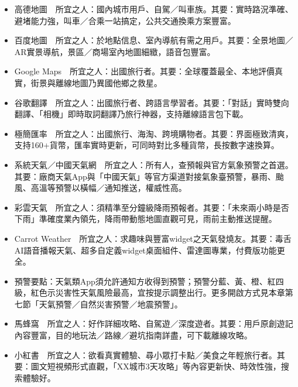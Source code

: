 
\begin{itemize}
  \item 高德地圖　所宜之人：國內城市用戶、自駕／叫車族。其要：實時路況準確、避堵能力強，叫車／合乘一站搞定，公共交通換乘方案豐富。
  \item 百度地圖　所宜之人：於地點信息、室內導航有需之用戶。其要：全景地圖／AR實景導航，景區／商場室內地圖細緻，語音包豐富。
  \item Google Maps　所宜之人：出國旅行者。其要：全球覆蓋最全、本地評價真實，街景與離線地圖乃異國他鄉之救星。
\end{itemize}


\begin{itemize}
  \item 谷歌翻譯　所宜之人：出國旅行者、跨語言學習者。其要：「對話」實時雙向翻譯、「相機」即時取詞翻譯乃旅行神器，支持離線語言包下載。
\end{itemize}


\begin{itemize}
  \item 極簡匯率　所宜之人：出國旅行、海淘、跨境購物者。其要：界面極致清爽，支持160+貨幣，匯率實時更新，可同時對比多種貨幣，長按數字速換算。
\end{itemize}


\begin{itemize}
  \item 系統天氣／中國天氣網　所宜之人：所有人，查預報與官方氣象預警之首選。其要：廠商天氣App與「中國天氣」等官方渠道對接氣象臺預警，暴雨、颱風、高溫等預警以橫幅／通知推送，權威性高。
  \item 彩雲天氣　所宜之人：須精準至分鐘級降雨預報者。其要：「未來兩小時是否下雨」準確度業內領先，降雨帶動態地圖直觀可見，雨前主動推送提醒。
  \item Carrot Weather　所宜之人：求趣味與豐富widget之天氣發燒友。其要：毒舌AI語音播報天氣、超多自定義widget桌面組件、雷達圖專業，付費版功能更全。
  \item 預警要點：天氣類App須允許通知方收得到預警；預警分藍、黃、橙、紅四級，紅色示災害性天氣風險最高，宜按提示調整出行。更多開啟方式見本章第七節「天氣預警／自然災害預警／地震預警」。
\end{itemize}


\begin{itemize}
  \item 馬蜂窩　所宜之人：好作詳細攻略、自駕遊／深度遊者。其要：用戶原創遊記內容豐富，目的地玩法／路線／避坑指南詳盡，可下載離線攻略。
  \item 小紅書　所宜之人：欲看真實體驗、尋小眾打卡點／美食之年輕旅行者。其要：圖文短視頻形式直觀，「XX城市3天攻略」等內容更新快、時效性強，搜索體驗好。
\end{itemize}

